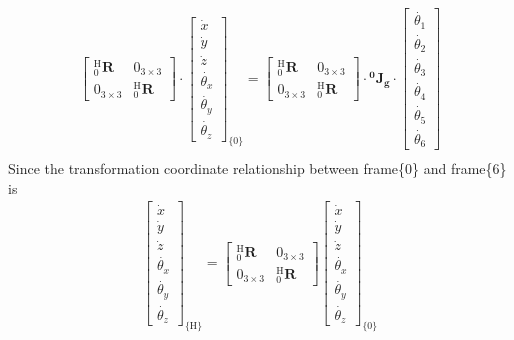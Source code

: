 \begin{equation}
\label{eq:jg6_leftmul}
\begin{split}
\begin{bmatrix}
^{\mathrm{H}}_0\mathbf{R} & 0_{ 3\times 3} \\ 
0_{ 3\times 3} & ^{\mathrm{H}}_{0}\mathbf{R}
\end{bmatrix}
\cdot
\begin{bmatrix}
\dot{x}\\
\dot{y}\\
\dot{z}\\
\dot{\theta _x}\\
\dot{\theta _y}\\
\dot{\theta _z}
\end{bmatrix}_{\!\{0\}}
=
\begin{bmatrix}
^{\mathrm{H}}_0\mathbf{R} & 0_{ 3\times 3} \\ 
0_{ 3\times 3} & ^{\mathrm{H}}_{0}\mathbf{R}
\end{bmatrix}
\cdot
\mathbf{^0\!J_g} \cdot 
\begin{bmatrix}
\dot{\theta _1} \\ 
\dot{\theta _2} \\ 
\dot{\theta _3} \\ 
\dot{\theta _4} \\ 
\dot{\theta _5} \\ 
\dot{\theta _6} 
\end{bmatrix}\\
\end{split}
\end{equation}
Since the transformation coordinate relationship between frame\{0\} and frame\{6\} is 
\begin{equation}
\label{eq: t06}
\begin{split}
\begin{bmatrix}
\dot{x}\\ 
\dot{y}\\ 
\dot{z}\\ 
\dot{\theta_x}\\ 
\dot{\theta_y}\\
\dot{\theta_z} 
\end{bmatrix}_{\!\{\mathrm{H}\}}
=
\begin{bmatrix}
^\mathrm{H}_0\mathbf{R} & 0_{ 3\times 3} \\ 
0_{ 3\times 3} & ^\mathrm{H}_0\mathbf{R}
\end{bmatrix}
\begin{bmatrix}
\dot{x}\\ 
\dot{y}\\ 
\dot{z}\\ 
\dot{\theta_x}\\ 
\dot{\theta_y}\\
\dot{\theta_z} 
\end{bmatrix}_{\!\{0\}}
\end{split}
\end{equation}
